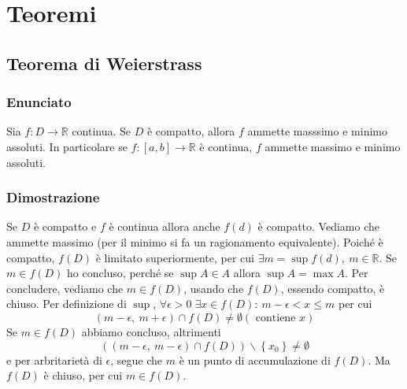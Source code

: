 \documentclass[12pt,a4paper]{article}
\newcommand*{\ep}{\epsilon}
\newcommand{\fr}{$f: D \to \mathbb{R} $}
\begin{document}
\section*{Teoremi}
\subsection*{Teorema di Weierstrass}
\subsubsection*{Enunciato}
Sia \fr{} continua. Se $D$ è compatto, allora $f$ ammette masssimo e minimo assoluti. In particolare se $f : \left[a, b\right] \to \mathbb{R} $ è continua, $f$ ammette massimo e minimo assoluti. 
\subsubsection*{Dimostrazione}
Se $D$ è compatto e $f$ è continua allora anche $f(d)$ è compatto. Vediamo che ammette massimo (per il minimo si fa un ragionamento equivalente). Poiché è compatto, $f(D)$ è limitato superiormente, per cui $\exists m = \sup f(d),\: m \in \mathbb{R}$. Se $m \in f(D)$ ho concluso, perché se $\sup A \in A$ allora $\sup A = \max A$. Per concludere, vediamo che $m \in f(D)$, usando che $f(D)$, essendo compatto, è chiuso. Per definizione di $\sup$, $\forall \ep > 0 \; \exists x \in f(D) : \: m - \ep < x \le m$ per cui \[\left( m - \ep, \: m + \ep \right) \cap f(D) \neq \emptyset \left(\text{ contiene } x\right) \] Se $m \in f(D)$ abbiamo concluso, altrimenti \[\left(\left(m - \ep, \: m - \ep \right) \cap  f(D)\right) \smallsetminus \left\{x_0\right\} \neq \emptyset \] e per arbritarietà di $\ep$, segue che $m$ è un punto di accumulazione di $f(D)$. Ma $f(D)$ è chiuso, per cui $m \in f(D)$.
\end{document}
